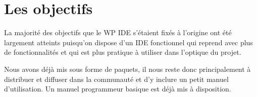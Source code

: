 \section{Les objectifs}

La majorité des objectifs que le WP IDE s'étaient fixés à l'origine ont été largement atteints puisqu'on dispose d'un IDE fonctionnel qui reprend \CoqIde{} avec plus de fonctionnalités et qui est plus pratique à utiliser dans l'optique du projet.

Nous avons déjà mis \CoquilleIDE{} sous forme de paquets, il nous reste donc principalement à distribuer et diffuser \CoquilleIDE{} dans la communauté \Coq{} et d'y inclure un petit manuel d'utilisation. Un manuel programmeur basique est déjà mis à disposition.

